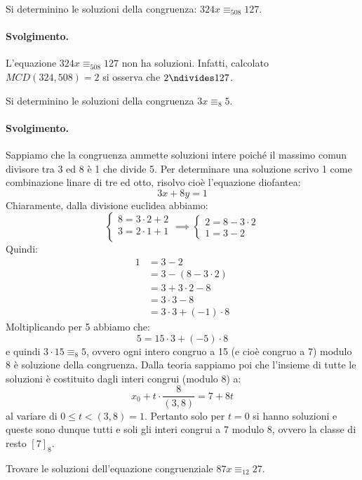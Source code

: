 \begin{exsbox}
	Si determinino le soluzioni della congruenza: $324x \equiv_{508} 127$.
\end{exsbox}
\paragraph*{Svolgimento.} L'equazione $324x \equiv_{508} 127$ non ha soluzioni. Infatti, calcolato  $MCD(324,508)=2$ si osserva che $2 \ndivides 127$. \hfill \blacksquare

\begin{exsbox}
	Si determinino le soluzioni della congruenza $3x \equiv_{8} 5$.
\end{exsbox}

\paragraph*{Svolgimento.}
Sappiamo che la congruenza ammette soluzioni intere poiché il massimo comun divisore tra 3 ed 8 è 1 che divide 5. Per determinare una soluzione scrivo 1 come combinazione linare di tre ed otto, risolvo cioè l'equazione diofantea:
\begin{displaymath}
	3x+8y=1
\end{displaymath}
Chiaramente, dalla divisione euclidea abbiamo:
\begin{displaymath}
	\left \lbrace
	\begin{array}{l}
		8 = 3 \cdot 2 + 2 \\
		3 = 2 \cdot 1 + 1 \\
	\end{array}
	\right .
	\implies
	\left\lbrace
	\begin{array}{l}
		2 = 8 - 3 \cdot 2\\
		1 = 3 - 2
	\end{array}
	\right .
\end{displaymath}
Quindi:
\begin{align*}
	1	&=  3 -  2  \\
	&= 3 -( 8-3 \cdot 2)\\
	&= 3 + 3 \cdot 2 - 8 \\
	&= 3 \cdot 3 -8 \\
	&= 3 \cdot 3 + (-1) \cdot 8
\end{align*}
Moltiplicando per 5 abbiamo che:
\begin{displaymath}
	5 = 15 \cdot 3 + (-5) \cdot 8
\end{displaymath}
e quindi $3 \cdot 15 \equiv_{8} 5$, ovvero ogni intero congruo a 15 (e cioè congruo a 7) modulo 8 è soluzione della congruenza. Dalla teoria sappiamo poi che l'insieme di tutte le soluzioni è costituito dagli interi congrui (modulo 8) a:
\begin{displaymath}
	x_{0} + t \cdot \frac{8}{(3,8)} =7+8t
\end{displaymath}
al variare di $0 \leq t < (3,8)=1$. Pertanto solo per $t=0$ si hanno soluzioni e queste sono dunque tutti e soli gli interi congrui a 7 modulo 8, ovvero la classe di resto $[7]_{8}$. \hfill \blacksquare
\begin{exsbox}
	Trovare le soluzioni dell'equazione congruenziale $87x \equiv_{12} 27$.
\end{exsbox}
